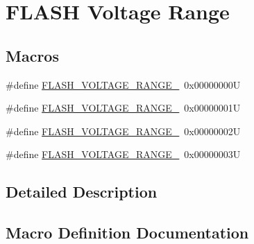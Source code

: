 \hypertarget{group___f_l_a_s_h_ex___voltage___range}{}\section{F\+L\+A\+SH Voltage Range}
\label{group___f_l_a_s_h_ex___voltage___range}
\subsection*{Macros}
\begin{DoxyCompactItemize}
\item 
\#define \mbox{\hyperlink{group___f_l_a_s_h_ex___voltage___range_ga5cadf49a63c968cde3b980e5139d398e}{F\+L\+A\+S\+H\+\_\+\+V\+O\+L\+T\+A\+G\+E\+\_\+\+R\+A\+N\+G\+E\+\_}}~0x00000000U
\item 
\#define \mbox{\hyperlink{group___f_l_a_s_h_ex___voltage___range_gad047be2bc7aa9be946b5b0c6b3062ef3}{F\+L\+A\+S\+H\+\_\+\+V\+O\+L\+T\+A\+G\+E\+\_\+\+R\+A\+N\+G\+E\+\_}}~0x00000001U
\item 
\#define \mbox{\hyperlink{group___f_l_a_s_h_ex___voltage___range_ga50950407a789684eec9216f49e0831a0}{F\+L\+A\+S\+H\+\_\+\+V\+O\+L\+T\+A\+G\+E\+\_\+\+R\+A\+N\+G\+E\+\_}}~0x00000002U
\item 
\#define \mbox{\hyperlink{group___f_l_a_s_h_ex___voltage___range_gabf8037a482f18815c5a67f287223a658}{F\+L\+A\+S\+H\+\_\+\+V\+O\+L\+T\+A\+G\+E\+\_\+\+R\+A\+N\+G\+E\+\_}}~0x00000003U
\end{DoxyCompactItemize}


\subsection{Detailed Description}


\subsection{Macro Definition Documentation}
\mbox{\label{group___f_l_a_s_h_ex___voltage___range_ga5cadf49a63c968cde3b980e5139d398e}} 
